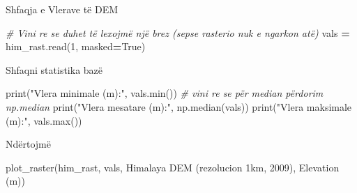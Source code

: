 \documentclass[
  ignorenonframetext,
]{beamer}
\newenvironment{Shaded}{\begin{snugshade}}{\end{snugshade}}
\newcommand{\BuiltInTok}[1]{#1}
\newcommand{\CommentTok}[1]{\textcolor[rgb]{0.56,0.35,0.01}{\textit{#1}}}
\newcommand{\DecValTok}[1]{\textcolor[rgb]{0.00,0.00,0.81}{#1}}
\newcommand{\NormalTok}[1]{#1}
\newcommand{\OperatorTok}[1]{\textcolor[rgb]{0.81,0.36,0.00}{\textbf{#1}}}
\newcommand{\StringTok}[1]{\textcolor[rgb]{0.31,0.60,0.02}{#1}}
\newcommand{\VariableTok}[1]{\textcolor[rgb]{0.00,0.00,0.00}{#1}}
\begin{document}
\begin{frame}[fragile]{Shfaqja e Vlerave të DEM}
\protect\hypertarget{shfaqja-e-vlerave-tuxeb-dem}{}

\begin{Shaded}
\begin{Highlighting}[]
\CommentTok{\# Vini re se duhet të lexojmë një brez (sepse rasterio nuk e ngarkon atë)}
\NormalTok{vals }\OperatorTok{=}\NormalTok{ him\_rast.read(}\DecValTok{1}\NormalTok{, masked}\OperatorTok{=}\VariableTok{True}\NormalTok{)}
\end{Highlighting}
\end{Shaded}
\end{frame}

\begin{frame}[fragile]{Shfaqni statistika bazë}
\protect\hypertarget{shfaqni-statistika-bazuxeb}{}

\begin{Shaded}
\begin{Highlighting}[]
\BuiltInTok{print}\NormalTok{(}\StringTok{"Vlera minimale (m):"}\NormalTok{, vals.}\BuiltInTok{min}\NormalTok{())}
\CommentTok{\# vini re se për median përdorim np.median}
\BuiltInTok{print}\NormalTok{(}\StringTok{"Vlera mesatare (m):"}\NormalTok{, np.median(vals))}
\BuiltInTok{print}\NormalTok{(}\StringTok{"Vlera maksimale (m):"}\NormalTok{, vals.}\BuiltInTok{max}\NormalTok{())}
\end{Highlighting}
\end{Shaded}
\end{frame}

\begin{frame}[fragile]{Ndërtojmë}
\protect\hypertarget{nduxebrtojmuxeb}{}

\begin{Shaded}
\begin{Highlighting}[]
\NormalTok{plot\_raster(him\_rast, vals, }\StringTok{\textquotesingle{}Himalaya DEM (rezolucion 1km, 2009)\textquotesingle{}}\NormalTok{, }\StringTok{\textquotesingle{}Elevation (m)\textquotesingle{}}\NormalTok{)}
\end{Highlighting}
\end{Shaded}
\end{frame}
\end{document}
